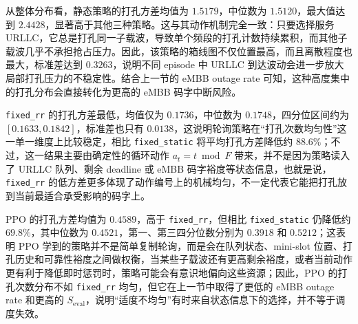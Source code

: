 \begin{table}[H]
\centering
\small
\caption{打孔计数方差箱线图对应的分布统计量}
\label{tab:puncture_variance_box_data}
\end{table}

从整体分布看，静态策略的打孔方差均值为 \(1.5179\)，中位数为 \(1.5120\)，最大值达到 \(2.4428\)，显著高于其他三种策略。这与其动作机制完全一致：只要选择服务 URLLC，它总是打孔同一子载波，导致单个频段的打孔计数持续累积，而其他子载波几乎不承担抢占压力。因此，该策略的箱线图不仅位置最高，而且离散程度也最大，标准差达到 \(0.3263\)，说明不同 episode 中 URLLC 到达波动会进一步放大局部打孔压力的不稳定性。结合上一节的 eMBB outage rate 可知，这种高度集中的打孔分布会直接转化为更高的 eMBB 码字中断风险。

\texttt{fixed\_rr} 的打孔方差最低，均值仅为 \(0.1736\)，中位数为 \(0.1748\)，四分位区间约为 \([0.1633,0.1842]\)，标准差也只有 \(0.0138\)，这说明轮询策略在“打孔次数均匀性”这一单一维度上比较稳定，相比 \texttt{fixed\_static} 将平均打孔方差降低约 \(88.6\%\)；不过，这一结果主要由确定性的循环动作 \(a_t=t\bmod F\) 带来，并不是因为策略读入了 URLLC 队列、剩余 deadline 或 eMBB 码字裕度等状态信息，也就是说，\texttt{fixed\_rr} 的低方差更多体现了动作编号上的机械均匀，不一定代表它能把打孔放到当前最适合承受影响的码字上。

PPO 的打孔方差均值为 \(0.4589\)，高于 \texttt{fixed\_rr}，但相比 \texttt{fixed\_static} 仍降低约 \(69.8\%\)，其中位数为 \(0.4521\)，第一、第三四分位数分别为 \(0.3918\) 和 \(0.5212\)；这表明 PPO 学到的策略并不是简单复制轮询，而是会在队列状态、mini-slot 位置、打孔历史和可靠性裕度之间做权衡，当某些子载波还有更高剩余裕度，或者当前动作更有利于降低即时惩罚时，策略可能会有意识地偏向这些资源；因此，PPO 的打孔次数分布不如 \texttt{fixed\_rr} 均匀，但它在上一节中取得了更低的 eMBB outage rate 和更高的 \(S_{\text{eval}}\)，说明“适度不均匀”有时来自状态信息下的选择，并不等于调度失效。

